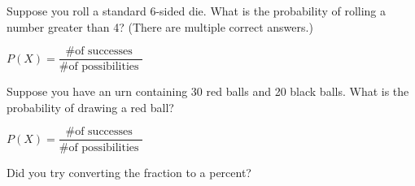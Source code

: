 \documentclass{ximera}
\begin{document}
\begin{question}
Suppose you roll a standard 6-sided die. What is the probability of rolling a number greater than 4? (There are multiple correct answers.)

    \begin{multipleChoice}
      \end{multipleChoice}
    \begin{hint}
    $P(X) = \dfrac{ \text{\# of successes }}{ \text{\# of possibilities } }$
    \end{hint}
\end{question}

\begin{question}
Suppose you have an urn containing 30 red balls and 20 black balls. What is the probability of drawing a red ball?

    \begin{multipleChoice}
      \end{multipleChoice}
    \begin{hint}
    $P(X) = \dfrac{ \text{\# of successes }}{ \text{\# of possibilities } }$
    \end{hint}
    \begin{hint}
    Did you try converting the fraction to a percent?
    \end{hint}

\end{question}
\end{document}
